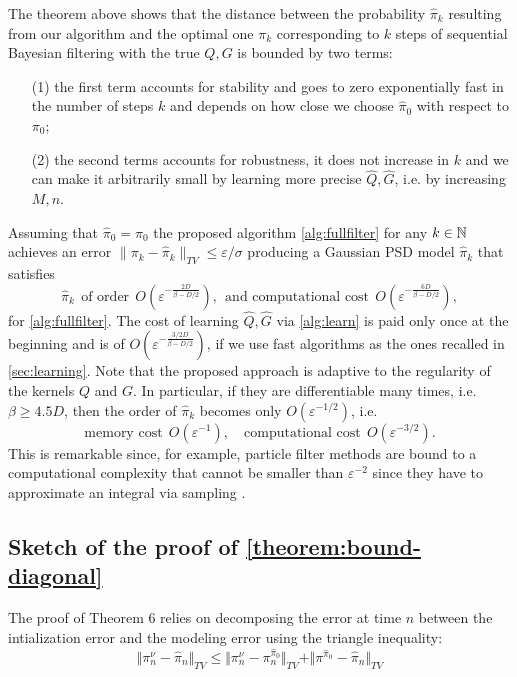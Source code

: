 The theorem above shows that the distance between the probability $\hat \pi_k$ resulting from our algorithm and the optimal one $\pi_k$ corresponding to $k$ steps of sequential Bayesian filtering with the true $Q, G$ is bounded by two terms:
\begin{enumerate}
\item[(1)] the first term accounts for stability and goes to zero exponentially fast in the number of steps $k$ and depends on how close we choose $\hat{\pi}_0$ with respect to $\pi_0$;
\item[(2)] the second terms accounts for robustness, it does not increase in $k$ and we can make it arbitrarily small by learning more precise $\hat{Q}, \hat{G}$, i.e. by increasing $M, n$.
\end{enumerate}

Assuming that $\hat{\pi}_0 = \pi_0$ the proposed algorithm \cref{alg:fullfilter} for any $k \in\mathbb N$ achieves an error $\|\pi_k - \hat{\pi}_k\|_{TV} \leq \varepsilon/\sigma$ producing a Gaussian PSD model $\hat{\pi}_k$ that satisfies
$$ \hat{\pi}_k ~~\textrm{of order}~~  O(\varepsilon^{-\frac{2D}{\beta - D/2}}), ~~\textrm{and computational cost} ~~ O(\varepsilon^{-\frac{6D}{\beta - D/2}}),$$
for \cref{alg:fullfilter}. The cost of learning $\hat{Q}, \hat{G}$ via \cref{alg:learn} is paid only once at the beginning and is of $O(\varepsilon^{-\frac{3/2D}{\beta - D/2}})$, if we use fast algorithms as the ones recalled in \cref{sec:learning}. Note that the proposed approach is adaptive to the regularity of the kernels $Q$ and $G$. In particular, if they are differentiable many times, i.e. $\beta \geq 4.5 D$, then the order of $\hat{\pi}_k$ becomes only  $O(\varepsilon^{-1/2})$, i.e.
$$
\textrm{memory cost} ~~ O(\varepsilon^{-1}), \quad \textrm{computational cost} ~~ O(\varepsilon^{-3/2}).
$$
%
This is remarkable since, for example, particle filter methods are bound to a computational complexity that cannot be smaller than $\varepsilon^{-2}$ since they have to approximate an integral via sampling \citep{oudjane}.

\subsection{Sketch of the proof of \cref{theorem:bound-diagonal}}\label{sec:sketches-filter}
The proof of Theorem 6 relies on decomposing the error at time $n$ between the intialization error and the modeling error using the triangle inequality:
\begin{equation*}
\Vert \pi^\nu_n - \hat\pi_n\Vert_{TV} \leq \Vert\pi^\nu_n - \pi^{\hat \pi_0}_n\Vert_{TV} + \Vert\pi^{\hat\pi_0} - \hat \pi_n\Vert_{TV}
\end{equation*}

